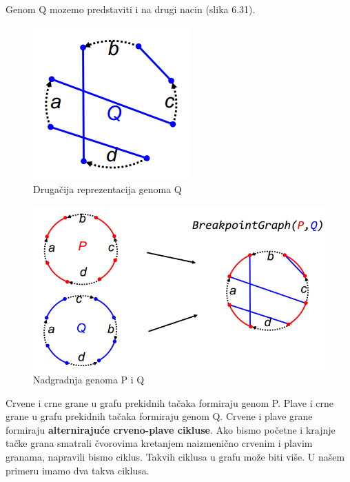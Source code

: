 Genom {\color{blue}Q} mozemo predstaviti i na drugi nacin (slika 6.31).
\begin{figure}[h!]
\centering
\includegraphics[scale=0.75]{poglavlja/6/slike/Q2.PNG}
\caption{Drugačija reprezentacija genoma Q}
\label{PQ}
\end{figure}
\fi 

\begin{figure}[h]
\includegraphics[scale=0.7]{poglavlja/6/slike/breakpointgraph.PNG}
\caption{Nadgradnja genoma P i Q}
\label{slika:nadgradnja}
\end{figure}

Crvene i crne grane u grafu prekidnih tačaka formiraju genom P. Plave i crne grane u grafu prekidnih tačaka  formiraju genom Q.  Crvene i plave grane formiraju \textbf{alternirajuće crveno-plave cikluse}. Ako bismo početne i krajnje tačke grana smatrali čvorovima kretanjem naizmenično crvenim i plavim granama, napravili bismo ciklus. Takvih ciklusa u grafu može biti više. U našem primeru imamo dva takva ciklusa. 

